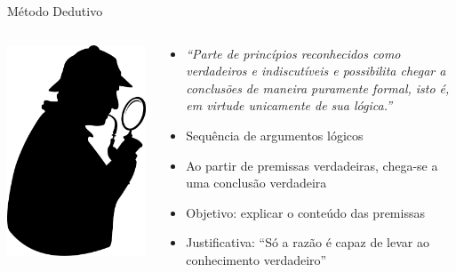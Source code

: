 \documentclass{beamer}
\begin{document}
\begin{frame}{Método Dedutivo}
  \begin{columns}
    \begin{column}{3cm}
    \includegraphics[width=\textwidth]{Metodos/sherlock_holmes}
    \end{column}
    \begin{column}{7.5cm}
      \begin{itemize}
      \item {\em``Parte de princípios reconhecidos como verdadeiros e
        indiscutíveis e possibilita chegar a conclusões de maneira
        puramente formal, isto é, em virtude unicamente de sua
        lógica.''}
      \item Sequência de argumentos lógicos
      \item Ao partir de premissas verdadeiras, chega-se a uma
        conclusão verdadeira
      \item Objetivo: explicar o conteúdo das premissas
      \item Justificativa: ``Só a razão é capaz de levar ao
        conhecimento verdadeiro''
      \end{itemize}
  \end{column}
\end{columns}
\end{frame}
\end{document}
